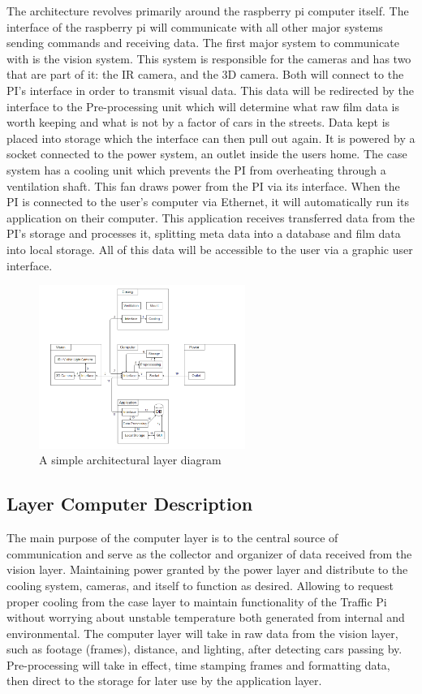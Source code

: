 The architecture revolves primarily around the raspberry pi computer itself.  The interface of the raspberry pi will communicate with all other major systems sending commands and receiving data.  The first major system to communicate with is the vision system.  This system is responsible for the cameras and has two that are part of it: the IR camera, and the 3D camera.  Both will connect to the PI's interface in order to transmit visual data.  This data will be redirected by the interface to the Pre-processing unit which will determine what raw film data is worth keeping and what is not by a factor of cars in the streets.  Data kept is placed into storage which the interface can then pull out again.  It is powered by a socket connected to the power system, an outlet inside the users home.  The case system has a cooling unit which prevents the PI from overheating through a ventilation shaft.  This fan draws power from the PI via its interface.  When the PI is connected to the user's computer via Ethernet, it will automatically run its application on their computer.  This application receives transferred data from the PI's storage and processes it, splitting meta data into a database and film data into local storage.  All of this data will be accessible to the user via a graphic user interface.

\begin{figure}[h!]
	\centering
 	\includegraphics[width=0.60\textwidth]{images/ADS.png}
 \caption{A simple architectural layer diagram}
\end{figure}

\subsection{Layer Computer Description}
The main purpose of the computer layer is to the central source of communication and serve as the collector and organizer of data received from the vision layer. Maintaining power granted by the power layer and distribute to the cooling system, cameras, and itself to function as desired. Allowing to request proper cooling from the case layer to maintain functionality of the Traffic Pi without worrying about unstable temperature both generated from internal and environmental. The computer layer will take in raw data from the vision layer, such as footage (frames), distance, and lighting, after detecting cars passing by. Pre-processing will take in effect, time stamping frames and formatting data, then direct to the storage for later use by the application layer.

